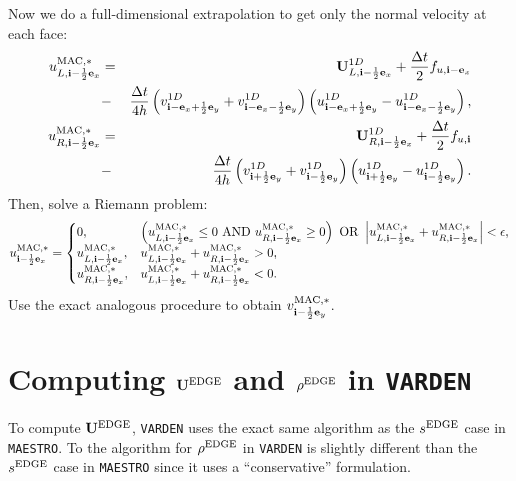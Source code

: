 \documentclass[11pt]{article}
\def\half  {\frac{1}{2}}
\def\dt    {\Delta t}
\def\edge  {\rm EDGE}
\def\mac   {\rm MAC}
\def\eb    {{\bf e}}
\def\ib    {{\bf i}}
\def\Ub    {{\bf U}}
\begin{document}
Now we do a full-dimensional extrapolation to get only the normal velocity at each face:
\begin{eqnarray}
u_{L,\ib-\half\eb_x}^{\mac,*} &=& \Ub_{L,\ib-\half\eb_x}^{1D} + \frac{\dt}{2}f_{u,\ib-\eb_x} \nonumber \\
&-& \frac{\dt}{4h}\left(v_{\ib-\eb_x+\half\eb_y}^{1D}+v_{\ib-\eb_x-\half\eb_y}^{1D}\right)\left(u_{\ib-\eb_x+\half\eb_y}^{1D} - u_{\ib-\eb_x-\half\eb_y}^{1D}\right), \\
u_{R,\ib-\half\eb_x}^{\mac,*} &=& \Ub_{R,\ib-\half\eb_x}^{1D} + \frac{\dt}{2}f_{u,\ib} \nonumber \\
&-& \frac{\dt}{4h}\left(v_{\ib+\half\eb_y}^{1D}+v_{\ib-\half\eb_y}^{1D}\right)\left(u_{\ib+\half\eb_y}^{1D} - u_{\ib-\half\eb_y}^{1D}\right).
\end{eqnarray}
Then, solve a Riemann problem:
\begin{equation}
u_{\ib-\half\eb_x}^{\mac,*} =
\begin{cases}
0, & \left(u_{L,\ib-\half\eb_x}^{\mac,*} \le 0 ~ {\rm AND} ~ u_{R,\ib-\half\eb_x}^{\mac,*} \ge 0\right) ~ {\rm OR} ~ \left|u_{L,\ib-\half\eb_x}^{\mac,*} + u_{R,\ib-\half\eb_x}^{\mac,*}\right| < \epsilon, \\
u_{L,\ib-\half\eb_x}^{\mac,*}, & u_{L,\ib-\half\eb_x}^{\mac,*} + u_{R,\ib-\half\eb_x}^{\mac,*} > 0, \\
u_{R,\ib-\half\eb_x}^{\mac,*}, & u_{L,\ib-\half\eb_x}^{\mac,*} + u_{R,\ib-\half\eb_x}^{\mac,*} < 0.
\end{cases}
\end{equation}
Use the exact analogous procedure to obtain $v^{\mac,*}_{\ib-\half\eb_y}$.
\cleardoublepage
\section{Computing $\Ub^{\edge}$ and $\rho^{\edge}$ in {\tt VARDEN}}
To compute $\Ub^{\edge}$, {\tt VARDEN} uses the exact same algorithm as the $s^{\edge}$ case in {\tt MAESTRO}.  To the algorithm for $\rho^{\edge}$ in {\tt VARDEN} is slightly different than the $s^{\edge}$ case in {\tt MAESTRO} since it uses a ``conservative'' formulation.  
\end{document}
